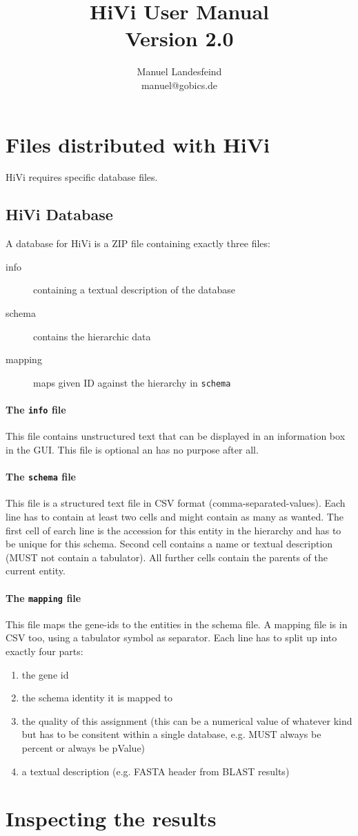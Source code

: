 \documentclass{article}
\author{Manuel Landesfeind\\manuel@gobics.de}
\title{HiVi User Manual\\Version 2.0}
\begin{document}
\maketitle
\tableofcontents




\section{Files distributed with HiVi}
HiVi requires specific database files.

\subsection{HiVi Database}
A database for HiVi is a ZIP file containing exactly three files:
\begin{description}
	\item[info] containing a textual description of the database
	\item[schema] contains the hierarchic data
	\item[mapping] maps given ID against the hierarchy in \texttt{schema}
\end{description}

\paragraph{The \texttt{info} file} This file contains unstructured text that
can be displayed in an information box in the GUI. This file is optional an
has no purpose after all.

\paragraph{The \texttt{schema} file} This file is a structured text file in
CSV format (comma-separated-values). Each line has to contain at least two
cells and might contain as many as wanted. The first cell of earch line is the
accession for this entity in the hierarchy and has to be unique for this
schema. Second cell contains a name or textual description (MUST not contain a
tabulator). All further cells contain the parents of the current entity.

\paragraph{The \texttt{mapping} file} This file maps the gene-ids to the
entities in the schema file. A mapping file is in CSV too, using a tabulator
symbol as separator. Each line has to split up into exactly four parts:
\begin{enumerate}
	\item the gene id
	\item the schema identity it is mapped to
	\item the quality of this assignment (this can be a numerical value of
		whatever kind but has to be consitent within a single database, e.g.
		MUST always be percent or always be pValue)
	\item a textual description (e.g. FASTA header from BLAST results)
\end{enumerate}




\section{Inspecting the results}
\end{document}

